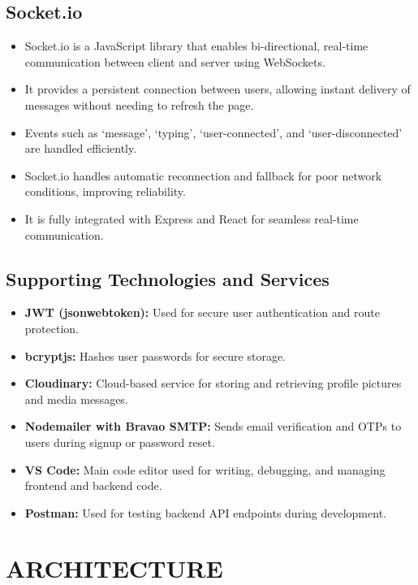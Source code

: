 \documentclass[12pt,a4paper]{report}
\begin{document}
\section{Socket.io}
\begin{itemize}
    \item Socket.io is a JavaScript library that enables bi-directional, real-time communication between client and server using WebSockets.
    \item It provides a persistent connection between users, allowing instant delivery of messages without needing to refresh the page.
    \item Events such as ‘message’, ‘typing’, ‘user-connected’, and ‘user-disconnected’ are handled efficiently.
    \item Socket.io handles automatic reconnection and fallback for poor network conditions, improving reliability.
    \item It is fully integrated with Express and React for seamless real-time communication.
\end{itemize}

\section{Supporting Technologies and Services}
\begin{itemize}
    \item \textbf{JWT (jsonwebtoken):} Used for secure user authentication and route protection.
    \item \textbf{bcryptjs:} Hashes user passwords for secure storage.
    \item \textbf{Cloudinary:} Cloud-based service for storing and retrieving profile pictures and media messages.
    \item \textbf{Nodemailer with Bravao SMTP:} Sends email verification and OTPs to users during signup or password reset.
    \item \textbf{VS Code:} Main code editor used for writing, debugging, and managing frontend and backend code.
    \item \textbf{Postman:} Used for testing backend API endpoints during development.
\end{itemize}


\newpage


\chapter{ARCHITECTURE}
\end{document}
